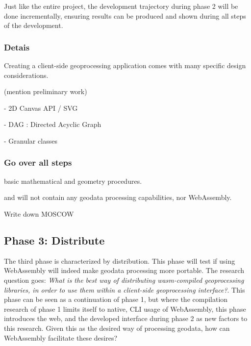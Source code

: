 


Just like the entire project, the development trajectory during phase 2 will be done incrementally, ensuring results can be produced and shown during all steps of the development. 




\subsubsection*{Detais}


Creating a client-side geoprocessing application comes with many specific design considerations. 



(mention preliminary work)

- 2D Canvas API / SVG 

- DAG : Directed Acyclic Graph

- Granular classes 


\subsubsection*{Go over all steps}


basic mathematical and geometry procedures. 

and will not contain any geodata processing capabilities, nor WebAssembly. 

Write down MOSCOW






\subsection{Phase 3: Distribute}



The third phase is characterized by distribution. 
This phase will test if using WebAssembly will indeed make geodata processing more portable.  
The research question goes: \textit{What is the best way of distributing wasm-compiled geoprocessing libraries, in order to use them within a client-side geoprocessing interface?}. 
This phase can be seen as a continuation of phase 1, but where the compilation research of phase 1 limits itself to native, CLI usage of WebAssembly, this phase introduces the web, and the developed interface during phase 2 as new factors to this research. Given this as the desired way of processing geodata, how can WebAssembly facilitate these desires? 

